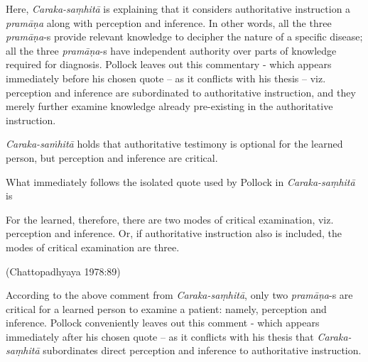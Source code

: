 Here, {\sl Caraka-saṃhitā} is explaining that it considers authoritative instruction a {\sl pramāṇa} along with perception and inference. In other words, all the three {\sl pramāṇa}-s provide relevant knowledge to decipher the nature of a specific disease; all the three {\sl pramāṇa}-s have independent authority over parts of knowledge required for diagnosis. Pollock leaves out this commentary - which appears immediately before his chosen quote -- as it conflicts with his thesis -- viz. perception and inference are subordinated to authoritative instruction, and they merely further examine knowledge already pre-existing in the authoritative instruction.

\newpage

{\sl Caraka-saṁhitā} holds that authoritative testimony is optional for the learned person, but perception and inference are critical.

What immediately follows the isolated quote used by Pollock in {\sl Caraka-saṃhitā} is 
\begin{myquote}
For the learned, therefore, there are two modes of critical examination, viz. perception and inference. Or, if authoritative instruction also is included, the modes of critical examination are three.

\hfill (Chattopadhyaya 1978:89)
\end{myquote}

According to the above comment from {\sl Caraka-saṃhitā}, only two {\sl pramāṇa}-s are critical for a learned person to examine a patient: namely, perception and inference. Pollock conveniently leaves out this comment - which appears immediately after his chosen quote -- as it conflicts with his thesis that {\sl Caraka-saṃhitā} subordinates direct perception and inference to authoritative instruction.  

